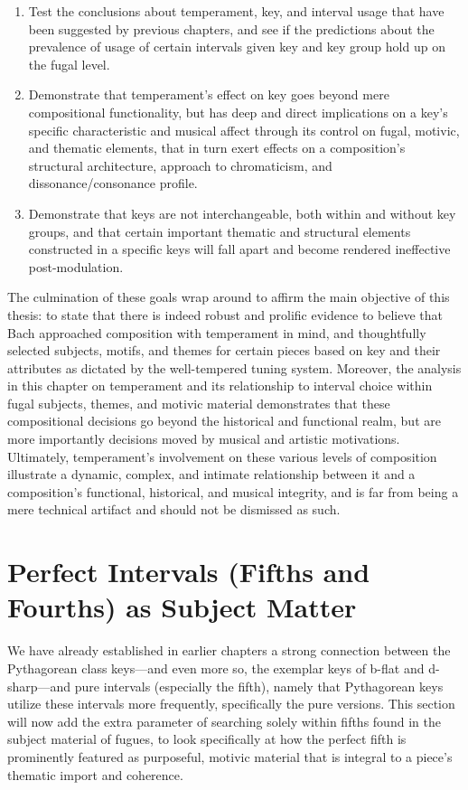 \begin{enumerate}
\def\labelenumi{\arabic{enumi}.}
\tightlist
\item
  Test the conclusions about temperament, key, and interval usage that
  have been suggested by previous chapters, and see if the predictions
  about the prevalence of usage of certain intervals given key and key
  group hold up on the fugal level.
\item
  Demonstrate that temperament's effect on key goes beyond mere
  compositional functionality, but has deep and direct implications on a
  key's specific characteristic and musical affect through its control
  on fugal, motivic, and thematic elements, that in turn exert effects
  on a composition's structural architecture, approach to chromaticism,
  and dissonance/consonance profile.
\item
  Demonstrate that keys are not interchangeable, both within and without
  key groups, and that certain important thematic and structural
  elements constructed in a specific keys will fall apart and become
  rendered ineffective post-modulation.
\end{enumerate}

The culmination of these goals wrap around to affirm the main objective
of this thesis: to state that there is indeed robust and prolific
evidence to believe that Bach approached composition with temperament in
mind, and thoughtfully selected subjects, motifs, and themes for certain
pieces based on key and their attributes as dictated by the
well-tempered tuning system. Moreover, the analysis in this chapter on
temperament and its relationship to interval choice within fugal
subjects, themes, and motivic material demonstrates that these
compositional decisions go beyond the historical and functional realm,
but are more importantly decisions moved by musical and artistic
motivations. Ultimately, temperament's involvement on these various
levels of composition illustrate a dynamic, complex, and intimate
relationship between it and a composition's functional, historical, and
musical integrity, and is far from being a mere technical artifact and
should not be dismissed as such.

    \section{Perfect Intervals (Fifths and Fourths) as Subject
Matter}\label{perfect-intervals-fifths-and-fourths-as-subject-matter}

We have already established in earlier chapters a strong connection
between the Pythagorean class keys---and even more so, the exemplar
keys of b-flat and d-sharp---and pure intervals (especially the
fifth), namely that Pythagorean keys utilize these intervals more
frequently, specifically the pure versions. This section will now add
the extra parameter of searching solely within fifths found in the
subject material of fugues, to look specifically at how the perfect
fifth is prominently featured as purposeful, motivic material that is
integral to a piece's thematic import and coherence.

